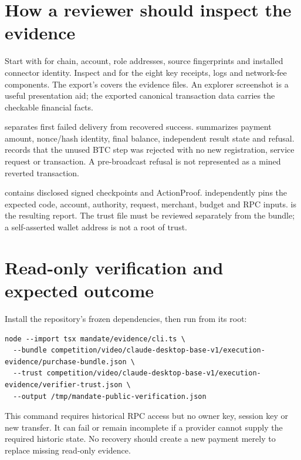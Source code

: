 \section{How a reviewer should inspect the evidence}
Start with  for chain, account, role addresses, source fingerprints and installed connector identity. Inspect  and  for the eight key receipts, logs and network-fee components. The export's  covers the evidence files. An explorer screenshot is a useful presentation aid; the exported canonical transaction data carries the checkable financial facts.

 separates first failed delivery from recovered success.  summarizes payment amount, nonce/hash identity, final balance, independent result state and refusal.  records that the unused BTC step was rejected with no new registration, service request or transaction. A pre-broadcast refusal is not represented as a mined reverted transaction.

 contains disclosed signed checkpoints and ActionProof.  independently pins the expected code, account, authority, request, merchant, budget and RPC inputs.  is the resulting report. The trust file must be reviewed separately from the bundle; a self-asserted wallet address is not a root of trust.\citep{case,implementation}

\section{Read-only verification and expected outcome}
Install the repository's frozen dependencies, then run from its root:

\noindent\begin{minipage}{\linewidth}
\begin{lstlisting}
node --import tsx mandate/evidence/cli.ts \
  --bundle competition/video/claude-desktop-base-v1/execution-evidence/purchase-bundle.json \
  --trust competition/video/claude-desktop-base-v1/execution-evidence/verifier-trust.json \
  --output /tmp/mandate-public-verification.json
\end{lstlisting}
\end{minipage}\par

This command requires historical RPC access but no owner key, session key or new transfer. It can fail or remain incomplete if a provider cannot supply the required historic state. No recovery should create a new payment merely to replace missing read-only evidence.

